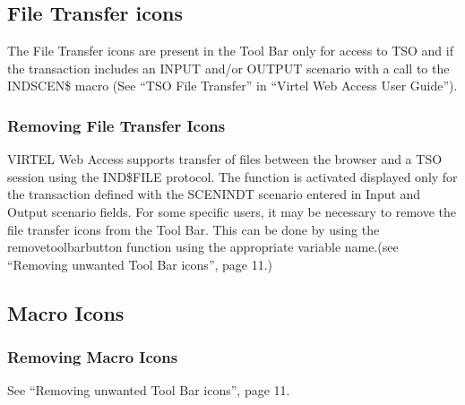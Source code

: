 \documentclass[letterpaper,10pt,english]{sphinxmanual}
\begin{document}
\subsection{File Transfer icons}
\label{\detokenize{Customization:file-transfer-icons}}\label{\detokenize{Customization:index-29}}
\sphinxAtStartPar
The File Transfer icons are present in the Tool Bar only for access to TSO and if the transaction includes an INPUT and/or OUTPUT scenario with a call to the INDSCEN\$ macro (See “TSO File Transfer” in “Virtel Web Access User Guide”).

\ignorespaces 

\subsubsection{Removing File Transfer Icons}
\label{\detokenize{Customization:removing-file-transfer-icons}}\label{\detokenize{Customization:index-30}}
\sphinxAtStartPar
VIRTEL Web Access supports transfer of files between the browser and a TSO session using the IND\$FILE protocol. The function is activated displayed only for the transaction defined with the SCENINDT scenario entered in Input and Output scenario fields. For some specific users, it may be necessary to remove the file transfer icons from the Tool Bar.
This can be done by using the removetoolbarbutton function using the appropriate variable name.(see “Removing unwanted Tool Bar icons”, page 11.)

\ignorespaces 

\subsection{Macro Icons}
\label{\detokenize{Customization:macro-icons}}\label{\detokenize{Customization:index-31}}
\ignorespaces 

\subsubsection{Removing Macro Icons}
\label{\detokenize{Customization:removing-macro-icons}}\label{\detokenize{Customization:index-32}}
\sphinxAtStartPar
See “Removing unwanted Tool Bar icons”, page 11.
\end{document}
